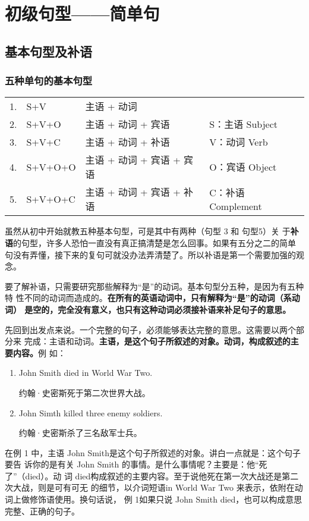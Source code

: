\documentclass{yufa}
\begin{document}
\mainmatter

\part{初级句型——简单句}

\chapter{基本句型及补语}

\section{五种单句的基本句型}

\begin{longtable}[]{@{}llll@{}}
  1. & S+V & 主语 + 动词 & \\
  2. & S+V+O & 主语 + 动词 + 宾语 & S：主语 Subject \\
  3. & S+V+C & 主语 + 动词 + 补语 & V：动词 Verb \\
  4. & S+V+O+O & 主语 + 动词 + 宾语 + 宾语 & O：宾语 Object \\
  5. & S+V+O+C & 主语 + 动词 + 宾语 + 补语 & C：补语 Complement
\end{longtable}

虽然从初中开始就教五种基本句型，可是其中有两种（句型 3 和 句型5）关
于\textbf{补语}的句型，许多人恐怕一直没有真正搞清楚是怎么回事。如果有五分之二的简单
句没有弄懂，接下来的复句可就没办法弄清楚了。所以补语是第一个需要加强的观念。

要了解补语，只需要研究那些解释为“是”的动词。基本句型分五种，是因为有五种特
性不同的动词而造成的。\textbf{在所有的英语动词中，只有解释为“是”的动词（系动词）
  是空的，完全没有意义，也只有这种动词必须接补语来补足句子的意思。}

先回到出发点来说。一个完整的句子，必须能够表达完整的意思。这需要以两个部分来
完成：主语和动词。\textbf{主语，是这个句子所叙述的对象。动词，构成叙述的主要内容。}例
如：

\begin{enumerate}
\item John Smith died in World War Two.

  约翰·史密斯死于第二次世界大战。
\item John Simth killed three enemy soldiers.

  约翰·史密斯杀了三名敌军士兵。
\end{enumerate}

在例 1 中，主语 John Smith是这个句子所叙述的对象。讲白一点就是：这个句子要告
诉你的是有关 John Smith 的事情。是什么事情呢？主要是：他“死了”（died）。动
词 died构成叙述的主要内容。至于说他死在第一次大战还是第二次大战，则是可有可无
的细节，以介词短语in World War Two 来表示，依附在动词上做修饰语使用。换句话说，
例 1如果只说 John Smith died，也可以构成意思完整、正确的句子。
\end{document}
